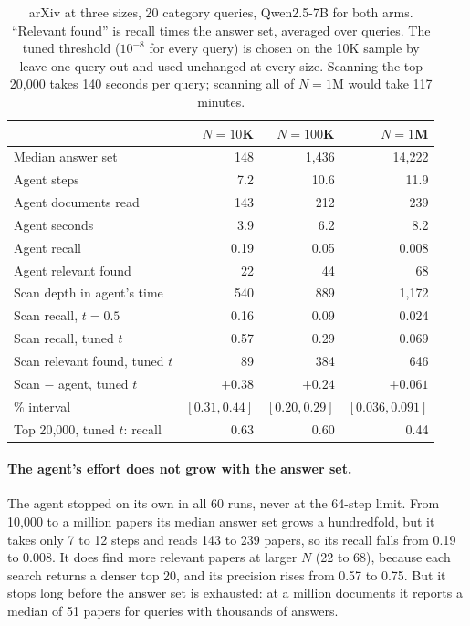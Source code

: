 \documentclass[11pt]{article}
\begin{document}
\begin{table}[t]
\centering
\small
\begin{tabular}{@{}lrrr@{}}
\toprule
& $N=10$K & $N=100$K & $N=1$M \\
\midrule
Median answer set & 148 & 1,436 & 14,222 \\
\addlinespace
Agent steps & 7.2 & 10.6 & 11.9 \\
Agent documents read & 143 & 212 & 239 \\
Agent seconds & 3.9 & 6.2 & 8.2 \\
Agent recall & 0.19 & 0.05 & 0.008 \\
Agent relevant found & 22 & 44 & 68 \\
\addlinespace
Scan depth in agent's time & 540 & 889 & 1,172 \\
Scan recall, $t=0.5$ & 0.16 & 0.09 & 0.024 \\
Scan recall, tuned $t$ & 0.57 & 0.29 & 0.069 \\
Scan relevant found, tuned $t$ & 89 & 384 & 646 \\
Scan $-$ agent, tuned $t$ & $+0.38$ & $+0.24$ & $+0.061$ \\
\quad 95\% interval & $[0.31, 0.44]$ & $[0.20, 0.29]$ & $[0.036, 0.091]$ \\
\addlinespace
Top 20,000, tuned $t$: recall & 0.63 & 0.60 & 0.44 \\
\bottomrule
\end{tabular}
\caption{arXiv at three sizes, 20 category queries, Qwen2.5-7B for both arms.
``Relevant found'' is recall times the answer set, averaged over queries. The
tuned threshold ($10^{-8}$ for every query) is chosen on the 10K sample by
leave-one-query-out and used unchanged at every size. Scanning the top 20,000
takes 140 seconds per query; scanning all of $N=1$M would take 117 minutes.}
\label{tab:scale}
\end{table}

\paragraph{The agent's effort does not grow with the answer set.}
The agent stopped on its own in all 60 runs, never at the 64-step limit. From
10,000 to a million papers its median answer set grows a hundredfold, but it
takes only 7 to 12 steps and reads 143 to 239 papers, so its recall falls from
0.19 to 0.008. It does find more relevant papers at larger $N$ (22 to 68),
because each search returns a denser top 20, and its precision rises from 0.57
to 0.75. But it stops long before the answer set is exhausted: at a million
documents it reports a median of 51 papers for queries with thousands of
answers.
\end{document}

